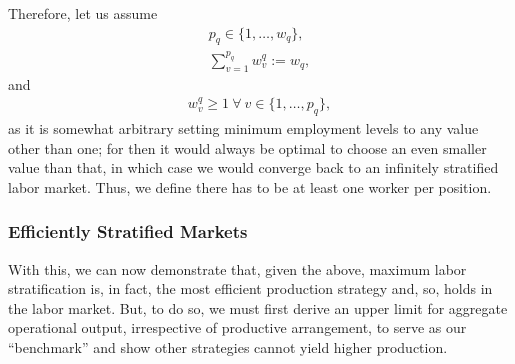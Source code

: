 \documentclass[hidelinks, nonatbib]{elsarticle}
\begin{document}
\begin{axiom}
    Therefore, let us assume
    \begin{gather}
    p_q \in \{1, \dots, w_q\}
    ,
    \\
    \sum_{v=1}^{p_q}
    w_{v}^{q}
    :=
    w_q
    ,
    \end{gather}
    and
    \begin{gather}
    w_{v}^{q}
    \geq
    1
    \
    \forall
    \
    v \in \{1, \dots, p_q\}
    ,
    \end{gather}
    as it is somewhat arbitrary setting minimum employment levels to any value other than one; for then it would always be optimal to choose an even smaller value than that, in which case we would converge back to an infinitely stratified labor market. Thus, we define there has to be at least one worker per position.
\end{axiom}

\subsubsection{Efficiently Stratified Markets}
With this, we can now demonstrate that, given the above, maximum labor stratification is, in fact, the most efficient production strategy and, so, holds in the labor market. But, to do so, we must first derive an upper limit for aggregate operational output, irrespective of productive arrangement, to serve as our ``benchmark'' and show other strategies cannot yield higher production.
\end{document}
